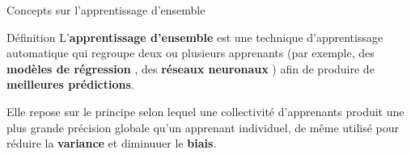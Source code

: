 \documentclass[aspectratio=169,xcolor=dvipsnames, t]{beamer}
\begin{document}
	\begin{frame}{Concepts sur l'apprentissage d'ensemble}
		\justifying
		\begin{block}{Définition}
			L'\textbf{apprentissage d'ensemble} est une technique d'apprentissage automatique qui regroupe deux ou plusieurs apprenants (par exemple, des \textbf{modèles de régression} , des \textbf{réseaux neuronaux} ) afin de produire de \textbf{meilleures prédictions}.
		\end{block}
		\pause[2]
		\begin{block}{ }
			Elle repose sur le principe selon lequel une collectivité d'apprenants produit une plus grande précision globale qu'un apprenant individuel, de même utilisé pour réduire la \textbf{variance} et diminuuer le \textbf{biais}.
		\end{block}
	\end{frame}
\end{document}
